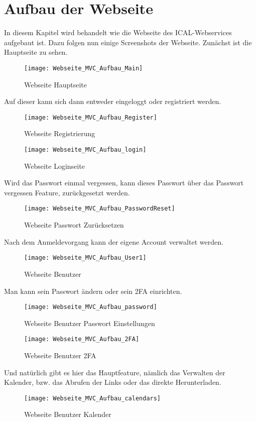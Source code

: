 {\section{Aufbau der Webseite }
\label{sec:aufbau}
In diesem Kapitel wird behandelt wie die Webseite des ICAL-Webservices aufgebaut ist. Dazu folgen nun einige Screenshots der Webseite.
Zunächst ist die Hauptseite zu sehen.\\
\begin{figure}[H]
    \texttt{[image: Webseite\_MVC\_Aufbau\_Main]}
    \caption{Webseite Hauptseite}
    \label{fig:webmainpage}
\end{figure}
Auf dieser kann sich dann entweder eingeloggt oder registriert werden.\\
\begin{figure}[H]
    \texttt{[image: Webseite\_MVC\_Aufbau\_Register]}
    \caption{Webseite Registrierung}
    \label{fig:webregister}
\end{figure}
\begin{figure}[H]
    \texttt{[image: Webseite\_MVC\_Aufbau\_login]}
    \caption{Webseite Loginseite}
    \label{fig:weblogin}
\end{figure}
Wird das Passwort einmal vergessen, kann dieses Passwort über das Passwort vergessen Feature, zurückgesetzt werden. 
\begin{figure}[H]
    \texttt{[image: Webseite\_MVC\_Aufbau\_PasswordReset]}
    \caption{Webseite Passwort Zurücksetzen}
    \label{fig:webpwdforgot}
\end{figure}
Nach dem Anmeldevorgang kann der eigene Account verwaltet werden.\\
\begin{figure}[H]
    \texttt{[image: Webseite\_MVC\_Aufbau\_User1]}
    \caption{Webseite Benutzer}
    \label{fig:webuser}
\end{figure}
Man kann sein Passwort ändern oder sein 2FA einrichten. \\
\begin{figure}[H]
    \texttt{[image: Webseite\_MVC\_Aufbau\_password]}
    \caption{Webseite Benutzer Passwort Einstellungen}
    \label{fig:webuserpwd}
\end{figure}
\begin{figure}[H]
    \texttt{[image: Webseite\_MVC\_Aufbau\_2FA]}
    \caption{Webseite Benutzer 2FA}
    \label{fig:webuser2fa}
\end{figure}
Und natürlich gibt es hier das Hauptfeature, nämlich das Verwalten der Kalender, bzw. das Abrufen der Links oder das direkte Herunterladen.\\
\begin{figure}[H]
    \texttt{[image: Webseite\_MVC\_Aufbau\_calendars]}
    \caption{Webseite Benutzer Kalender}
    \label{fig:webusercal}
\end{figure}
}

